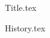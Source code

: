 \documentclass[a4paper,12pt]{book}
\begin{document}
\frontmatter

{Title.tex}

{History.tex}

\setcounter{tocdepth}{1}
\tableofcontents
\listoffigures
\listoftables
\lstlistoflistings

\mainmatter

\end{document}
